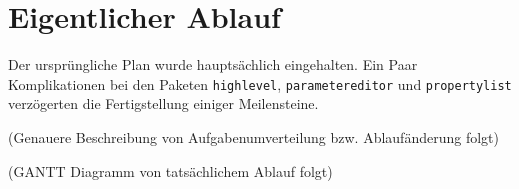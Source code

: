 \documentclass[a4paper]{scrreprt}
\begin{document}
\section{Eigentlicher Ablauf}
Der ursprüngliche Plan wurde hauptsächlich eingehalten. Ein Paar Komplikationen bei den Paketen \verb!highlevel!, \verb!parametereditor! und \verb!propertylist! verzögerten die Fertigstellung einiger Meilensteine.

(Genauere Beschreibung von Aufgabenumverteilung bzw. Ablaufänderung folgt)

(GANTT Diagramm von tatsächlichem Ablauf folgt)
\end{document}

